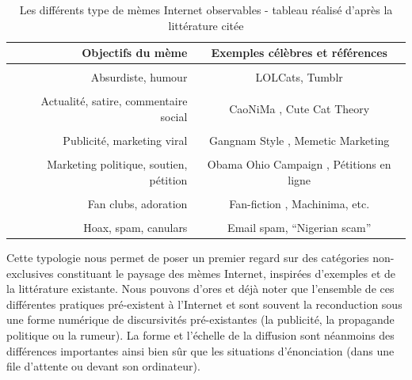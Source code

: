 \begin{table}[htbp]
    \centering
    \begin{tabulary}{\textwidth}{ R | C}
    \textbf{Objectifs du mème}  & \textbf{Exemples célèbres et références} \\[1ex]
    \hline \\ [-1.5ex]
    Absurdiste, humour &  LOLCats, Tumblr \citep{Bauckhage2011} \\[1ex]
    \hline \\ [-1.5ex]
    Actualité, satire, commentaire social  & CaoNiMa \citep{Mina2012}, Cute Cat Theory \citep{Zuckerman2008} \\[1ex]
    \hline \\ [-1.5ex]
    Publicité, marketing viral & Gangnam Style \citep{Bolsover2013}, Memetic Marketing \citep{Flor2000} \\[1ex]
    \hline \\ [-1.5ex]
    Marketing politique, soutien, pétition & Obama Ohio Campaign \citep{Walker2012}, Pétitions en ligne \citep{Adamic2014} \\[1ex]
    \hline \\ [-1.5ex]
    Fan clubs, adoration  &  Fan-fiction , Machinima, etc. \\[1ex]
    \hline \\ [-1.5ex]
    Hoax, spam, canulars & Email spam, ``Nigerian scam'' \\[1ex]
    \end{tabulary}

\caption[Typologie des mèmes]{Les différents type de mèmes Internet observables - tableau réalisé d{\textquoteright}après la littérature citée}
\label{fig:typologie-memes}

\end{table}


Cette typologie nous permet de poser un premier regard sur des catégories non-exclusives constituant le paysage des mèmes Internet, inspirées d{\textquoteright}exemples et de la littérature existante. Nous pouvons d{\textquoteright}ores et déjà noter que l{\textquoteright}ensemble de ces différentes pratiques pré-existent à l{\textquoteright}Internet et sont souvent la reconduction sous une forme numérique de discursivités pré-existantes (la publicité, la propagande politique ou la rumeur). La forme et l{\textquoteright}échelle de la diffusion sont néanmoins des différences importantes ainsi bien s\^ur que les situations d{\textquoteright}énonciation (dans une file d{\textquoteright}attente ou devant son ordinateur).

